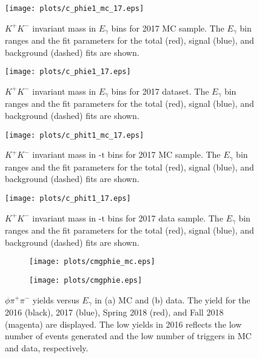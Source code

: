\begin{figure}[H]
    \centering
    \texttt{[image: plots/c\_phie1\_mc\_17.eps]}
    \caption{\label{fig.y2175.xsec_ul.phi2pi.3}$K^{+}K^{-}$ invariant mass in $E_{\gamma}$ bins for 2017 MC sample. The $E_{\gamma}$ bin ranges and the fit parameters for the total (red), signal (blue), and background (dashed) fits are shown.}
\end{figure}

\begin{figure}[H]
    \centering
    \texttt{[image: plots/c\_phie1\_17.eps]}
    \caption{\label{fig.y2175.xsec_ul.phi2pi.4}$K^{+}K^{-}$ invariant mass in $E_{\gamma}$ bins for 2017 dataset. The $E_{\gamma}$ bin ranges and the fit parameters for the total (red), signal (blue), and background (dashed) fits are shown.}
\end{figure}

\begin{figure}[H]
    \centering
    \texttt{[image: plots/c\_phit1\_mc\_17.eps]}
    \caption{\label{fig.y2175.xsec_ul.phi2pi.5}$K^{+}K^{-}$ invariant mass in $\mbox{-t}$ bins for 2017 MC sample. The $E_{\gamma}$ bin ranges and the fit parameters for the total (red), signal (blue), and background (dashed) fits are shown.}
\end{figure}

\begin{figure}[H]
    \centering
    \texttt{[image: plots/c\_phit1\_17.eps]}
    \caption{\label{fig.y2175.xsec_ul.phi2pi.6}$K^{+}K^{-}$ invariant mass in $\mbox{-t}$ bins for 2017 data sample. The $E_{\gamma}$ bin ranges and the fit parameters for the total (red), signal (blue), and background (dashed) fits are shown.}
\end{figure}

\begin{figure}[H]
    \centering
    \begin{subfigure}[b]{0.5\textwidth}
        \texttt{[image: plots/cmgphie\_mc.eps]}
        \caption{}
        \label{fig.y2175.xsec_ul.phi2pi.7.a}
    \end{subfigure}\hfill
    \begin{subfigure}[b]{0.5\textwidth}
        \texttt{[image: plots/cmgphie.eps]}
        \caption{}
        \label{fig.y2175.xsec_ul.phi2pi.7.b}
    \end{subfigure}
    \caption{\label{fig.y2175.xsec_ul.phi2pi.7}$\phi \pi^+ \pi^-$ yields versus $E_{\gamma}$ in (a) MC and (b) data. The yield for the 2016 (black), 2017 (blue), Spring 2018 (red), and Fall 2018 (magenta) are displayed. The low yields in 2016 reflects the low number of events generated and the low number of triggers in MC and data, respectively.}
\end{figure}

